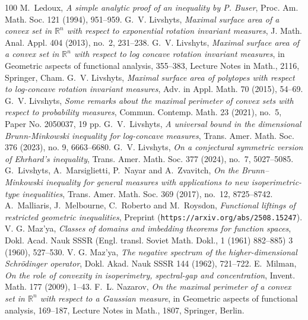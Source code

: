 \documentclass[11pt,leqno]{article}
\theoremstyle{definition}
\theoremstyle{remark}
\numberwithin{equation}{section}
\newcommand{\1}{\textbf{1}}
\begin{document}
\begin{thebibliography}{100}
 \textrm{M.\ Ledoux}, \textit{A simple analytic proof of an inequality by P. Buser},
Proc. Am. Math. Soc. {121} (1994), 951--959.
 \textrm{G.~V. Livshyts}, \textit{Maximal surface area of a convex set in $\mathbb{R}^n$ with respect to exponential rotation invariant measures}, J. Math. Anal. Appl. {404} (2013), no.~2, 231--238.
 \textrm{G.~V. Livshyts}, \textit{Maximal surface area of a convex set in $\mathbb{R}^n$ with respect to log concave rotation invariant measures}, in  Geometric aspects of functional analysis, 355--383, Lecture Notes in Math., 2116, Springer, Cham.
 \textrm{G.~V. Livshyts}, \textit{Maximal surface area of polytopes with respect to log-concave rotation invariant measures}, Adv. in Appl. Math. 70 (2015), 54--69.
 \textrm{G.~V. Livshyts}, \textit{Some remarks about the maximal perimeter of convex sets with respect to probability measures}, Commun. Contemp. Math.  23 (2021), no.~5, Paper No. 2050037, 19 pp.
 \textrm{G.\ V.\ Livshyts}, \textit{A universal bound in the dimensional Brunn-Minkowski inequality for log-concave measures}, 
Trans. Amer. Math. Soc. 376 (2023), no. 9, 6663--6680. 
 \textrm{G.~V. Livshyts}, \textit{On a conjectural symmetric version of Ehrhard's inequality}, Trans. Amer. Math. Soc.  377 (2024), no.~7, 5027--5085.
 \textrm{G.\ Livshyts, A.\ Marsiglietti, P.\ Nayar and A.\ Zvavitch},
\textit{On the Brunn--Minkowski inequality for general measures with applications to new isoperimetric-type inequalities}, 
Trans. Amer. Math. Soc. 369 (2017), no.~12, 8725--8742.
 \textrm{A.\ Malliaris, J.\ Melbourne, C.\ Roberto and M.\ Roysdon}, \textit{Functional liftings of restricted geometric inequalities}, Preprint ({\tt https://arxiv.org/abs/2508.15247}).
 \textrm{V. G. Maz'ya}, \textit{Classes of domains and imbedding theorems for function spaces},
Dokl. Acad. Nauk SSSR (Engl. transl. Soviet Math. Dokl., 1 (1961) 882--885) {3} (1960), 527--530.
 \textrm{V. G. Maz'ya}, \textit{The negative spectrum of the higher-dimensional Schr\"{o}dinger
 operator}, Dokl. Akad. Nauk SSSR {144} (1962), 721--722.
 \textrm{E.\ Milman}, \textit{On the role of convexity in isoperimetry, spectral-gap and concentration}, Invent. Math. 177 (2009), 1--43.
 \textrm{F.~L. Nazarov}, \textit{On the maximal perimeter of a convex set in $\mathbb{R}^n$ with respect to a Gaussian measure}, in Geometric aspects of functional analysis, 169--187, Lecture Notes in Math., 1807, Springer, Berlin.

\end{thebibliography}
\end{document}
